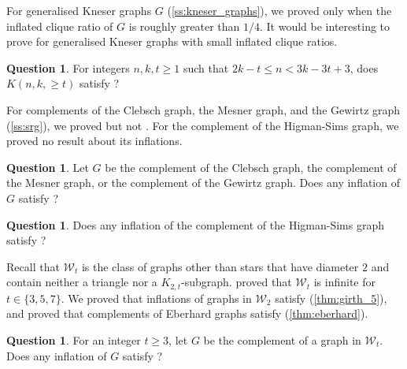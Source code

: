 \documentclass[11pt]{article}
\numberwithin{equation}{section}
\theoremstyle{plain}
\theoremstyle{definition}
\newtheorem{quest}[thm]{Question}
\renewcommand{\geq}{\geqslant}
\renewcommand{\leq}{\leqslant}
\begin{document}
For generalised Kneser graphs $G$ (\cref{ss:kneser_graphs}), we proved  only when the inflated clique ratio of $G$ is roughly greater than $1/4$. It would be interesting to prove  for generalised Kneser graphs with small inflated clique ratios.
\begin{quest}
    \label{q:g_kneser}
    For integers $n,k,t \geq 1$ such that $2k - t \leq n < 3k -3t + 3$, does $K(n,k,\geq t)$ satisfy ?
\end{quest}
For complements of the Clebsch graph, the Mesner graph, and the Gewirtz graph (\cref{ss:srg}), we proved  but not .
For the complement of the Higman-Sims graph, we proved no result about its inflations.
\begin{quest}
    \label{q:srg}
    Let $G$ be the complement of the Clebsch graph, the complement of the Mesner graph, or the complement of the Gewirtz graph. Does any inflation of $G$ satisfy ?
\end{quest}
\begin{quest}
    \label{q:other_vtx_transitive}
    Does any inflation of the complement of the Higman-Sims graph satisfy ?
\end{quest}
Recall that $\mathcal{W}_t$ is the class of graphs other than stars that have diameter $2$ and contain neither a triangle nor a $K_{2,t}$-subgraph.
\citet{ETT25} proved that $\mathcal{W}_t$ is infinite for $t \in \{3,5,7\}$. We proved that inflations of graphs in $\mathcal{W}_2$ satisfy  (\cref{thm:girth_5}), and proved that complements of Eberhard graphs satisfy  (\cref{thm:eberhard}).
\begin{quest}
    \label{q:eberhard}
    For an integer $t \geq 3$, let $G$ be the complement of a graph in $\mathcal{W}_{t}$. Does any inflation of $G$ satisfy ?
\end{quest}
\end{document}
